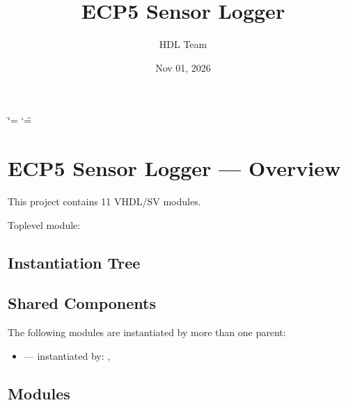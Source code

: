 \documentclass[letterpaper,10pt,english]{sphinxmanual}
\title{ECP5 Sensor Logger}
\date{Nov 01, 2026}
\author{HDL Team}
\begin{document}
\ifdefined\shorthandoff
  \ifnum\catcode`\=\string=\active\shorthandoff{=}\fi
  \ifnum\catcode`\"=\active{}\fi
\fi

\pagestyle{empty}
\sphinxmaketitle
\pagestyle{plain}
\sphinxtableofcontents
\pagestyle{normal}
\label{\detokenize{index::doc}}


\sphinxstepscope


\chapter{ECP5 Sensor Logger — Overview}
\label{\detokenize{overview:ecp5-sensor-logger-overview}}\label{\detokenize{overview::doc}}
\sphinxAtStartPar
This project contains 11 VHDL/SV modules.

\sphinxAtStartPar
Top\sphinxhyphen{}level module: {\hyperref[\detokenize{modules/top/index::doc}]{}}


\section{Instantiation Tree}
\label{\detokenize{overview:instantiation-tree}}


\section{Shared Components}
\label{\detokenize{overview:shared-components}}
\sphinxAtStartPar
The following modules are instantiated by more than one parent:
\begin{itemize}
\item {} 
\sphinxAtStartPar
{} — instantiated by: , 

\end{itemize}


\section{Modules}
\label{\detokenize{overview:modules}}
\end{document}
